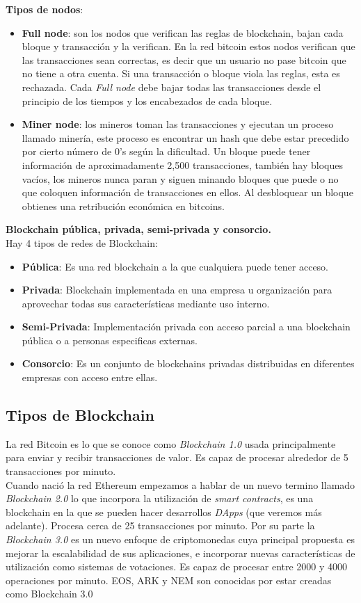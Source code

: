\documentclass[a4paper,12pt]{lib/pub}
\begin{document}
\textbf{Tipos de nodos}:
\begin{itemize}
\item \textbf{Full node}: son los nodos que verifican las reglas de blockchain, bajan cada bloque y transacción y la verifican. En la red bitcoin estos nodos verifican que las transacciones sean correctas, es decir que un usuario no pase bitcoin que no tiene a otra cuenta.
Si una transacción o bloque viola las reglas, esta es rechazada.
Cada \textit{Full node} debe bajar todas las transacciones desde el principio de los tiempos y los encabezados de cada bloque.

\item \textbf{Miner node}: los mineros toman las transacciones y ejecutan un proceso llamado minería, este proceso es encontrar un hash que debe estar precedido por cierto número de 0's según la dificultad. Un bloque puede tener información de aproximadamente 2,500 transacciones, también hay bloques vacíos, los mineros nunca paran y siguen minando bloques que puede o no que coloquen información de transacciones en ellos. Al desbloquear un bloque obtienes una retribución económica en bitcoins.\\
\end{itemize}

\textbf{Blockchain pública, privada, semi-privada y consorcio.}\\

Hay 4 tipos de redes de Blockchain:
\begin{itemize}
\item \textbf{Pública}: Es una red blockchain a la que cualquiera puede tener acceso.
\item  \textbf{Privada}: Blockchain implementada en una empresa u organización para aprovechar todas sus características mediante uso interno.
\item \textbf{Semi-Privada}: Implementación privada con acceso parcial a una blockchain pública o a personas especificas externas.
\item \textbf{Consorcio}: Es un conjunto de blockchains privadas distribuidas en diferentes empresas con acceso entre ellas.
\end{itemize}
\newpage
\subsection{Tipos de Blockchain}
La red Bitcoin es lo que se conoce como \textit{Blockchain 1.0} usada principalmente para enviar y recibir transacciones de valor. Es capaz de procesar alrededor de 5 transacciones por minuto.\\
Cuando nació la red Ethereum empezamos a hablar de un nuevo termino llamado \textit{Blockchain 2.0} lo que incorpora la utilización de \textit{smart contracts}, es una blockchain en la que se pueden hacer desarrollos \textit{DApps} (que veremos más adelante). Procesa cerca de 25 transacciones por minuto.
Por su parte la \textit{Blockchain 3.0} es un nuevo enfoque de criptomonedas cuya principal propuesta es mejorar la escalabilidad de sus aplicaciones, e incorporar nuevas características de utilización como sistemas de votaciones. Es capaz de procesar entre 2000 y 4000 operaciones por minuto. EOS, ARK y NEM son conocidas por estar creadas como Blockchain 3.0
\end{document}
